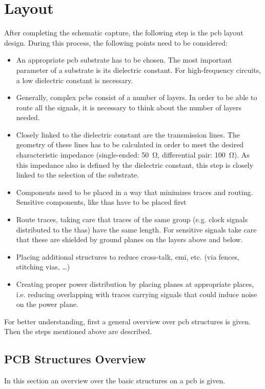 \section{Layout}
After completing the schematic capture, the following step is the \gls{pcb} layout design.
During this process, the following points need to be considered:
\begin{itemize}
	\item An appropriate \gls{pcb} substrate has to be chosen. The most important parameter of a substrate is its dielectric constant. For high-frequency circuits, a low dielectric constant is necessary.
	\item Generally, complex \glspl{pcb} consist of a number of layers. In order to be able to route all the signals, it is necessary to think about the number of layers needed. 
	\item Closely linked to the dielectric constant are the transmission lines. The geometry of these lines has to be calculated in order to meet the desired characteristic impedance (single-ended: \SI{50}{\ohm}, differential pair: \SI{100}{\ohm}). As this impedance also is defined by the dielectric constant, this step is closely linked to the selection of the substrate.
	\item Components need to be placed in a way that minimizes traces and routing. Sensitive components, like \glspl{tha} have to be placed first 
	\item Route traces, taking care that traces of the same group (e.g. clock signals distributed to the \glspl{tha}) have the same length. For sensitive signals take care that these are shielded by ground planes on the layers above and below.
	\item Placing additional structures to reduce cross-talk, \gls{emi}, etc. (via fences, stitching vias, \dots)
	\item Creating proper power distribution by placing planes at appropriate places, i.e. reducing overlapping with traces carrying signals that could induce noise on the power plane.
\end{itemize}

For better understanding, first a general overview over \gls{pcb} structures is given. 
Then the steps mentioned above are described.
\subsection*{PCB Structures Overview} \label{ssec:pcb_structs}
In this section an overview over the basic structures on a \gls{pcb} is given.
